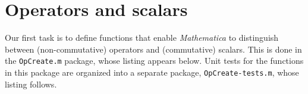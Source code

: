 \documentclass[12pt,letterpaper]{refart}
\begin{document}
\section{Operators and scalars}

Our first task is to define functions that enable \emph{Mathematica} to distinguish between (non-commutative) operators and (commutative) scalars.  This is done in the \verb+OpCreate.m+ package, whose listing appears below.  Unit tests for the functions in this package are organized into a separate package, \verb+OpCreate-tests.m+, whose listing follows. 



\end{document}
